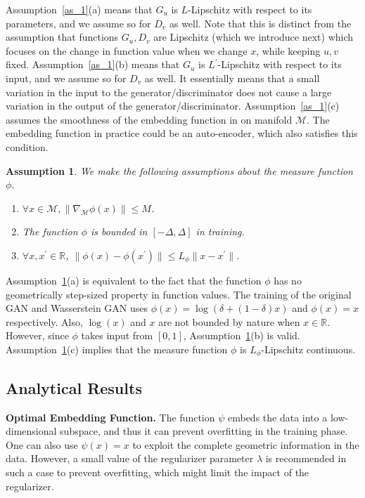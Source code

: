 \documentclass[10pt,twocolumn,letterpaper]{article}
\newcommand{\g}{{G_u}}
\newcommand{\di}{{D_v}}
\newcommand{\M}{\mathcal{M}}
\newtheorem{as}{Assumption}
\begin{document}
Assumption~\ref{as_1}(a) means that $\g$ is $L$-Lipschitz with respect to its parameters, and we assume so for $\di$ as well. Note that this is distinct from the assumption that functions $\g, \di$ are Lipschitz (which we introduce next) which focuses on the change in function value when we change $x$, while keeping $u, v$ fixed. Assumption~\ref{as_1}(b) means that $\g$ is $L^\prime$-Lipschitz with respect to its input, and we assume so for $\di$ as well. It essentially means that a small variation in the input to the generator/discriminator does not cause a large variation in the output of the generator/discriminator.
Assumption~\ref{as_1}(c) assumes the smoothness of the embedding function in on manifold $\M$. The embedding function in practice could be an auto-encoder, which also satisfies this condition.

\begin{as}\label{as_2}We make the following assumptions about the measure function $\phi$.
	\begin{enumerate}[label=(\alph*)]
		\item $\forall x\in \M, \|\nabla_\M \phi(x)\| \le M$.
		\item The function $\phi$ is bounded in $[-\Delta, \Delta]$ in training.
		\item $\forall x, x^\prime \in \mathbb R$, $\|\phi(x) - \phi(x^\prime)\| \le L_\phi\|x - x^\prime\|$.
	\end{enumerate}	
\end{as}


Assumption~\ref{as_2}(a) is equivalent to the fact that the function $\phi$ has no geometrically step-sized property in function values.
The training of the original GAN and Wasserstein GAN uses $\phi(x)=\log(\delta+(1-\delta)x)$ and $\phi(x)=x$ respectively. Also, $\log(x)$ and $x$ are not bounded by nature when $x\in \mathbb R$. However, since $\phi$ takes input from $[0,1]$, Assumption~\ref{as_2}(b) is valid.
Assumption~\ref{as_2}(c) implies that the measure function $\phi$ is $L_\phi$-Lipschitz continuous.

\subsection{Analytical Results}
\textbf{Optimal Embedding Function.} The function $\psi$ embeds the data into a low-dimensional subspace, and thus it can prevent overfitting in the training phase. One can also use $\psi(x) = x$ to exploit the complete geometric information in the data. However, a small value of the regularizer parameter $\lambda$ is recommended in such a case to prevent overfitting, which might limit the impact of the regularizer.
\end{document}
